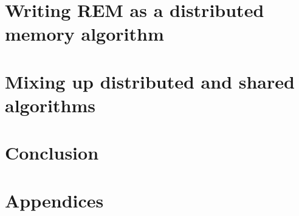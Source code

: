 \documentclass[12px]{article}
\begin{document}
  \section{Writing REM as a distributed memory algorithm}


  \section{Mixing up distributed and shared algorithms}


  \section{Conclusion}


  \section{Appendices}


  
  
\end{document}
